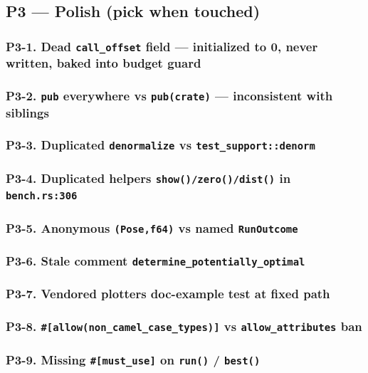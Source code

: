 \documentclass[11pt]{article}
\begin{document}
\subsection{P3 — Polish (pick when touched)}
\label{sec:org531d5f3}

\subsubsection{P3-1. Dead \texttt{call\_offset} field — initialized to 0, never written, baked into budget guard}
\label{sec:orgf2c67a4}
\subsubsection{P3-2. \texttt{pub} everywhere vs \texttt{pub(crate)} — inconsistent with siblings}
\label{sec:org0c6a20a}
\subsubsection{P3-3. Duplicated \texttt{denormalize} vs \texttt{test\_support::denorm}}
\label{sec:org7e11f3c}
\subsubsection{P3-4. Duplicated helpers \texttt{show()/zero()/dist()} in \texttt{bench.rs:306}}
\label{sec:org0969ad7}
\subsubsection{P3-5. Anonymous \texttt{(Pose,f64)} vs named \texttt{RunOutcome}}
\label{sec:orgf170002}
\subsubsection{P3-6. Stale comment \texttt{determine\_potentially\_optimal}}
\label{sec:orged10af9}
\subsubsection{P3-7. Vendored plotters doc-example test at fixed path}
\label{sec:orga73607e}
\subsubsection{P3-8. \texttt{\#[allow(non\_camel\_case\_types)]} vs \texttt{allow\_attributes} ban}
\label{sec:org9e2987c}
\subsubsection{P3-9. Missing \texttt{\#[must\_use]} on \texttt{run()} / \texttt{best()}}
\label{sec:orgc9c0430}
\end{document}
